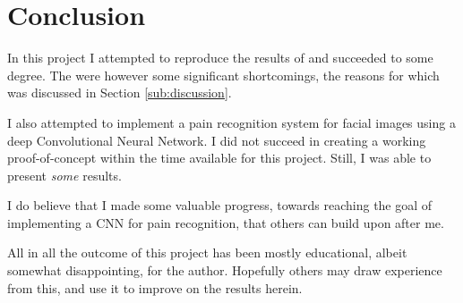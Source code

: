\documentclass[Main]{subfiles}
\begin{document}
\section{Conclusion} %
	\label{sec:conclusion}
	In this project I attempted to reproduce the results of \cite{Lucey2011} and succeeded to some degree. 
	The were however some significant shortcomings, the reasons for which was discussed in Section \ref{sub:discussion}.

	I also attempted to implement a pain recognition system for facial images using a deep Convolutional Neural Network.
	I did not succeed in creating a working proof-of-concept within the time available for this project.
	Still, I was able to present \emph{some} results.

	I do believe that I made some valuable progress, towards reaching the goal of implementing a CNN for pain recognition, that others can build upon after me.

	All in all the outcome of this project has been mostly educational, albeit somewhat disappointing, for the author.
	Hopefully others may draw experience from this, and use it to improve on the results herein.

\end{document}
